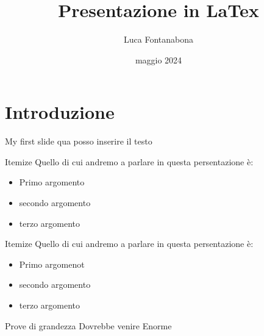 \documentclass{beamer} %
\title{Presentazione in LaTex}
\author{Luca Fontanabona}
\date{maggio 2024}
\begin{document}
\maketitle %


\section{Introduzione}

\begin{frame}{My first slide} %
qua posso inserire il testo %
\end{frame}

\begin{frame}{Itemize}
Quello di cui andremo a parlare in questa persentazione è: 
    \begin{itemize}
        \item Primo argomento
        \item secondo argomento 
        \item terzo argomento 
\end{itemize}
\end{frame}

\begin{frame}{Itemize}
Quello di cui andremo a parlare in questa persentazione è: 
    \begin{itemize}
        \item Primo argomenot 
        \pause \item  secondo argomento 
        \pause \item  terzo argomento 
\end{itemize}
\end{frame}



\begin{frame}{Prove di grandezza}
Dovrebbe venire  \Huge{Enorme}
\end{frame}
\end{document}
